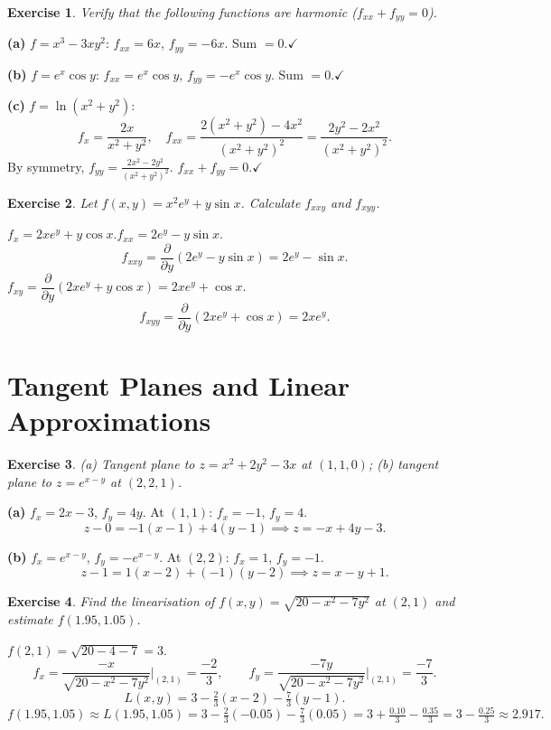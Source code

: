 \documentclass[12pt,a4paper]{article}
\theoremstyle{exstyle}
\newtheorem{exercise}{Exercise}[section]
\newcommand{\pd}[2]{\dfrac{\partial #1}{\partial #2}}
\begin{document}
\begin{exercise}
Verify that the following functions are harmonic ($f_{xx}+f_{yy}=0$).
\end{exercise}
\begin{solbox}
\textbf{(a)} $f=x^3-3xy^2$:
$f_{xx}=6x$, $f_{yy}=-6x$. Sum $=0$.\hfill$\checkmark$

\textbf{(b)} $f=e^x\cos y$:
$f_{xx}=e^x\cos y$, $f_{yy}=-e^x\cos y$. Sum $=0$.\hfill$\checkmark$

\textbf{(c)} $f=\ln(x^2+y^2)$:
\[
  f_x=\frac{2x}{x^2+y^2},\quad
  f_{xx}=\frac{2(x^2+y^2)-4x^2}{(x^2+y^2)^2}=\frac{2y^2-2x^2}{(x^2+y^2)^2}.
\]
By symmetry, $f_{yy}=\frac{2x^2-2y^2}{(x^2+y^2)^2}$.
$f_{xx}+f_{yy}=0$.\hfill$\checkmark$
\end{solbox}

\begin{exercise}
Let $f(x,y)=x^2e^y+y\sin x$. Calculate $f_{xxy}$ and $f_{xyy}$.
\end{exercise}
\begin{solbox}
$f_x=2xe^y+y\cos x$.\quad $f_{xx}=2e^y-y\sin x$.
\[
  f_{xxy}=\pd{}{y}(2e^y-y\sin x)=2e^y-\sin x.
\]
$f_{xy}=\pd{}{y}(2xe^y+y\cos x)=2xe^y+\cos x$.
\[
  f_{xyy}=\pd{}{y}(2xe^y+\cos x)=2xe^y.
\]
\end{solbox}

\section{Tangent Planes and Linear Approximations}

\begin{exercise}
(a) Tangent plane to $z=x^2+2y^2-3x$ at $(1,1,0)$;
(b) tangent plane to $z=e^{x-y}$ at $(2,2,1)$.
\end{exercise}
\begin{solbox}
\textbf{(a)} $f_x=2x-3$, $f_y=4y$. At $(1,1)$: $f_x=-1$, $f_y=4$.
\[
  z-0=-1(x-1)+4(y-1)\implies \boxed{z=-x+4y-3}.
\]

\textbf{(b)} $f_x=e^{x-y}$, $f_y=-e^{x-y}$. At $(2,2)$: $f_x=1$, $f_y=-1$.
\[
  z-1=1(x-2)+(-1)(y-2)\implies \boxed{z=x-y+1}.
\]
\end{solbox}

\begin{exercise}
Find the linearisation of $f(x,y)=\sqrt{20-x^2-7y^2}$ at $(2,1)$ and estimate $f(1.95,1.05)$.
\end{exercise}
\begin{solbox}
$f(2,1)=\sqrt{20-4-7}=3$.
\[
  f_x=\frac{-x}{\sqrt{20-x^2-7y^2}}\Bigg|_{(2,1)}=\frac{-2}{3},\qquad
  f_y=\frac{-7y}{\sqrt{20-x^2-7y^2}}\Bigg|_{(2,1)}=\frac{-7}{3}.
\]
\[
  L(x,y)=3-\tfrac{2}{3}(x-2)-\tfrac{7}{3}(y-1).
\]
\[
  f(1.95,1.05)\approx L(1.95,1.05)=3-\tfrac{2}{3}(-0.05)-\tfrac{7}{3}(0.05)
  =3+\tfrac{0.10}{3}-\tfrac{0.35}{3}=3-\tfrac{0.25}{3}\approx 2.917.
\]
\end{solbox}
\end{document}
